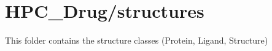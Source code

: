 

\section{HPC\_Drug/structures}

    This folder contains the structure classes (Protein, Ligand, Structure)

    

    

    

    

